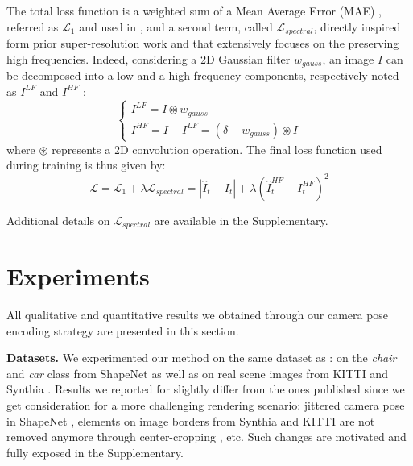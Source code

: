 The total loss function is a weighted sum  of a Mean Average Error (MAE) , referred as $\mathcal{L}_{1}$ and used in \citep{kim2020novel}, and a second term, called $\mathcal{L}_{spectral}$, directly inspired form prior super-resolution work \citep{fritsche2019frequency} and that extensively focuses on the preserving high frequencies. Indeed, considering a 2D Gaussian filter $w_{gauss}$, an image $I$ can be decomposed into a low and a high-frequency components, respectively noted as $I^{LF}$ and $I^{HF}$ : 
\begin{equation}
\begin{cases}
     I^{LF}  = I\circledast w_{gauss} \\
     I^{HF} = I - I^{LF} = (\delta - w_{gauss})\circledast I
\end{cases}
\end{equation}
where $\circledast$ represents a 2D convolution operation. 
The final loss function used during training is thus given by: 
\begin{equation}
    \mathcal{L} = \mathcal{L}_{1} + \lambda \mathcal{L}_{spectral} = |\hat{I}_{t} - I_{t}| + \lambda \left( \hat{I}_{t}^{HF} - I_{t}^{HF} \right)^{2}
    \label{eq:1}
\end{equation}



Additional details on $\mathcal{L}_{spectral}$ are available in the Supplementary.

\section{Experiments}
All qualitative and quantitative results we obtained through our camera pose encoding strategy are presented in this section. \newline

\noindent\textbf{Datasets.} We experimented our method on the same dataset as \citep{kim2020novel, sun2018multiview}: on the \textit{chair} and \textit{car} class from ShapeNet \citep{chang2015shapenet} as well as on real scene images from KITTI \citep{geiger2012we} and Synthia \citep{ros2016synthia}.
Results we reported for \citep{kim2020novel} slightly differ from the ones published since we get consideration for a more challenging rendering scenario: jittered camera pose in ShapeNet \citep{chang2015shapenet}, elements on image borders from Synthia \citep{ros2016synthia} and KITTI \citep{geiger2012we} are not removed anymore through  center-cropping , etc. Such changes are motivated and fully exposed in the Supplementary.  \newline

